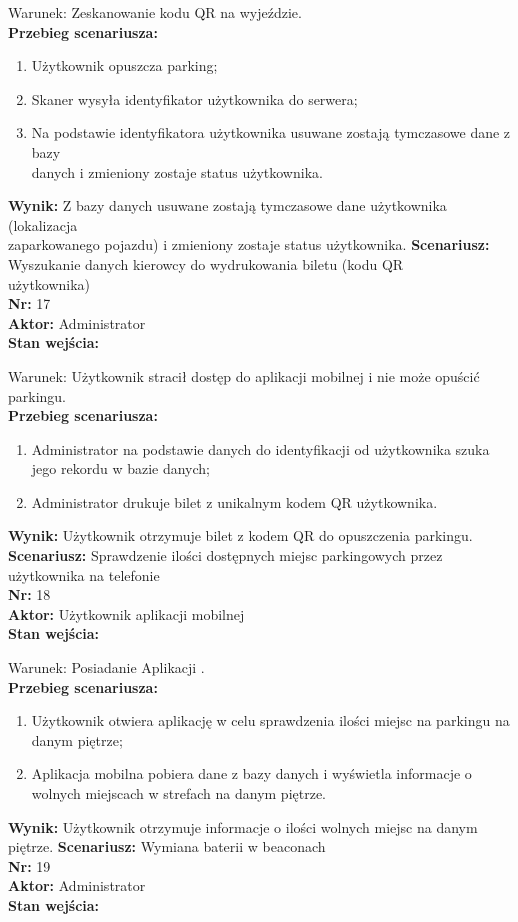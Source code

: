 \documentclass[12pt,a4paper]{article}
\begin{document}
Warunek: Zeskanowanie kodu QR na wyjeździe.
\\{\bf Przebieg scenariusza:}
\begin{enumerate}
\item Użytkownik opuszcza parking;
\item Skaner wysyła identyfikator użytkownika do serwera;
\item Na podstawie identyfikatora użytkownika usuwane zostają tymczasowe dane z bazy\\danych i zmieniony zostaje status użytkownika.
\end{enumerate}
{\bf Wynik:} Z bazy danych usuwane zostają tymczasowe dane użytkownika (lokalizacja\\zaparkowanego pojazdu) i zmieniony zostaje status użytkownika.
\newline\newline
{\large \bf Scenariusz:} Wyszukanie danych kierowcy do wydrukowania biletu (kodu QR\\użytkownika)
\\{\bf Nr:} 17
\\{\bf Aktor:} Administrator
\\{\bf Stan wejścia:}

Warunek: Użytkownik stracił dostęp do aplikacji mobilnej i nie może opuścić parkingu.
\\{\bf Przebieg scenariusza:}
\begin{enumerate}
\item Administrator na podstawie danych do identyfikacji od użytkownika szuka jego rekordu w bazie danych;
\item Administrator drukuje bilet z unikalnym kodem QR użytkownika.
\end{enumerate}
{\bf Wynik:} Użytkownik otrzymuje bilet z kodem QR do opuszczenia parkingu.
\newline\newline
{\large \bf Scenariusz:} Sprawdzenie ilości dostępnych miejsc parkingowych przez użytkownika na telefonie
\\{\bf Nr:} 18
\\{\bf Aktor:} Użytkownik aplikacji mobilnej
\\{\bf Stan wejścia:}

Warunek: Posiadanie Aplikacji .
\\{\bf Przebieg scenariusza:}
\begin{enumerate}
\item Użytkownik otwiera aplikację w celu sprawdzenia ilości miejsc na parkingu na danym piętrze;
\item Aplikacja mobilna pobiera dane z bazy danych i wyświetla informacje o wolnych miejscach w strefach na danym piętrze.
\end{enumerate}
{\bf Wynik:} Użytkownik otrzymuje informacje o ilości wolnych miejsc na danym piętrze.
\newline\newline
{\large \bf Scenariusz:} Wymiana baterii w beaconach
\\{\bf Nr:} 19
\\{\bf Aktor:} Administrator
\\{\bf Stan wejścia:}
\end{document}
